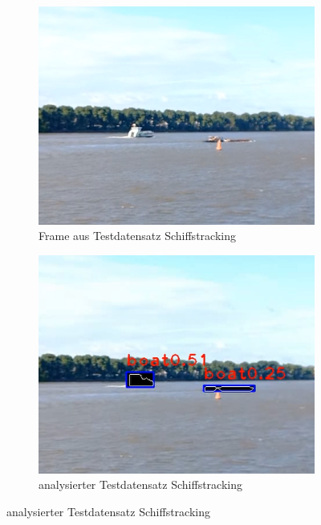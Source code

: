 {		
	\begin{figure}[ht]
		\begin{subfigure}[b]{0.45\textwidth}
			\centering
			\includegraphics[width=\linewidth]{images/Evaluation/shiptrack_cut_not_analyzed.png}
			\caption{Frame aus Testdatensatz Schiffstracking}
		\end{subfigure} \hfill
		\begin{subfigure}[b]{0.45\textwidth}
			\centering
			\includegraphics[width=\linewidth]{images/Evaluation/shiptrack_cut_analyzed.png}
			\caption{analysierter Testdatensatz Schiffstracking}
		\end{subfigure}

\end{figure}}
